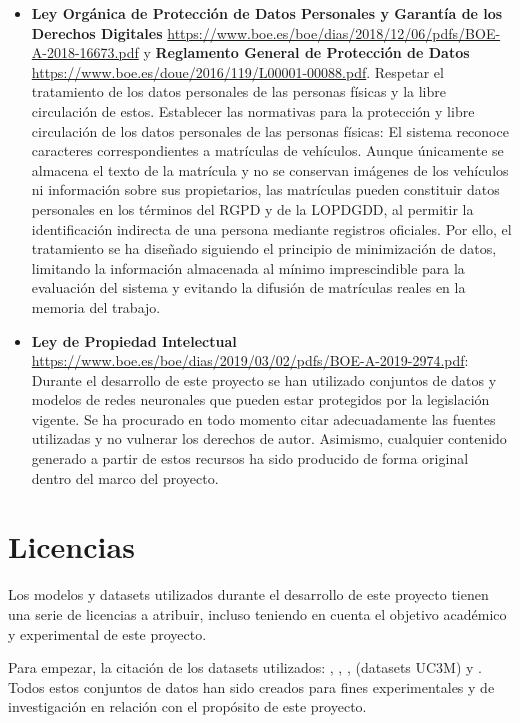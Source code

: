 \documentclass[12pt,a4paper,onecolumn,oneside]{report}
\begin{document}
\begin{itemize}
    \item \textbf{Ley Orgánica de Protección de Datos Personales y Garantía de los Derechos Digitales} \url{https://www.boe.es/boe/dias/2018/12/06/pdfs/BOE-A-2018-16673.pdf} y \textbf{Reglamento General de Protección de Datos} \url{https://www.boe.es/doue/2016/119/L00001-00088.pdf}. Respetar el tratamiento de los datos personales de las personas físicas y la libre circulación de estos. Establecer las normativas para la protección y libre circulación de los datos personales de las personas físicas: El sistema reconoce caracteres correspondientes a matrículas de vehículos. Aunque únicamente se almacena el texto de la matrícula y no se conservan imágenes de los vehículos ni información sobre sus propietarios, las matrículas pueden constituir datos personales en los términos del RGPD y de la LOPDGDD, al permitir la identificación indirecta de una persona mediante registros oficiales. Por ello, el tratamiento se ha diseñado siguiendo el principio de minimización de datos, limitando la información almacenada al mínimo imprescindible para la evaluación del sistema y evitando la difusión de matrículas reales en la memoria del trabajo.

    \item \textbf{Ley de Propiedad Intelectual} \url{https://www.boe.es/boe/dias/2019/03/02/pdfs/BOE-A-2019-2974.pdf}: Durante el desarrollo de este proyecto se han utilizado conjuntos de datos y modelos de redes neuronales que pueden estar protegidos por la legislación vigente. Se ha procurado en todo momento citar adecuadamente las fuentes utilizadas y no vulnerar los derechos de autor. Asimismo, cualquier contenido generado a partir de estos recursos ha sido producido de forma original dentro del marco del proyecto.
\end{itemize}

\section{Licencias}

Los modelos y datasets utilizados durante el desarrollo de este proyecto tienen una serie de licencias a atribuir, incluso teniendo en cuenta el objetivo académico y experimental de este proyecto.

Para empezar, la citación de los datasets utilizados: \cite{Sanchez-Iborra2026}, \cite{bdd100k}, \cite{WEN2020102907}, \cite{RAMAJOBALLESTER2024104608} (datasets UC3M) y \cite{xu2018towards}. Todos estos conjuntos de datos han sido creados para fines experimentales y de investigación en relación con el propósito de este proyecto. 
\end{document}
